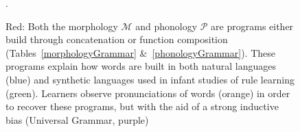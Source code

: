 \documentclass{article}
\begin{document}
\begin{figure}
  \caption{{\color{red}Red}: Both the morphology $\mathcal{M}$ and
    phonology $\mathcal{P}$ are programs either build through
    concatenation or function composition
    (Tables~\ref{morphologyGrammar} \&~\ref{phonologyGrammar}). These programs explain how words are built in both natural languages ({\color{blue}blue}) and synthetic languages used in infant studies of rule learning ({\color{green}green}). Learners observe pronunciations of words ({\color{orange}orange}) in order to recover these programs, but with the aid of a strong inductive bias (Universal Grammar, {\color{purple}purple})}.
  \label{beautiful}
\end{figure}
\end{document}
